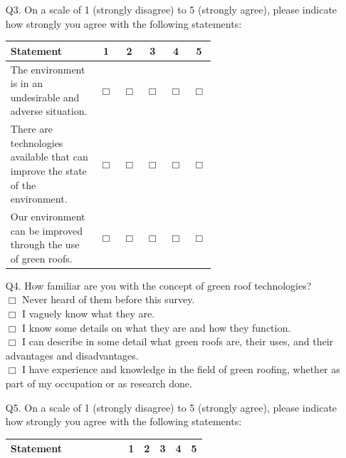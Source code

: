 \documentclass[a4paper]{article}
\begin{document}
\begin{appendices}
\begin{itemize}
    \item[Q3.] On a scale of 1 (strongly disagree) to 5 (strongly agree),
      please indicate how strongly you agree with the following statements:
      \begin{table}[H]
        \begin{tabular}{|p{0.6\linewidth}|c|c|c|c|c|}
          \hline
          Statement & 1 & 2 & 3 & 4 &
          5 \\ \hline

          The environment is in an undesirable and adverse situation. &
          $\Box$ & $\Box$ & $\Box$ & $\Box$ & $\Box$ \\ \hline

          There are technologies available that can improve the state of
          the environment. & $\Box$ & $\Box$ & $\Box$ & $\Box$ & $\Box$
          \\ \hline

          Our environment can be improved through the use of green roofs. &
          $\Box$ & $\Box$ & $\Box$ & $\Box$ & $\Box$ \\ \hline
        \end{tabular}
      \end{table}

    \item[Q4.] How familiar are you with the concept of green roof
      technologies? \\ $\Box$ Never heard of them before this survey. \\
      $\Box$ I vaguely know what they are. \\ $\Box$ I know some details on
      what they are and how they function. \\ $\Box$ I can describe in some
      detail what green roofs are, their uses, and their advantages and
      disadvantages. \\ $\Box$ I have experience and knowledge in the field
      of green roofing, whether as part of my occupation or as research done.

    \item[Q5.] On a scale of 1 (strongly disagree) to 5 (strongly agree),
      please indicate how strongly you agree with the following statements:
      \begin{table}[H]
        \begin{tabular}{|p{0.6\linewidth}|c|c|c|c|c|}
          \hline
          Statement & 1 & 2 & 3 & 4 &
          5 \\ \hline


\end{tabular}
\end{table}
\end{itemize}
\end{appendices}
\end{document}
